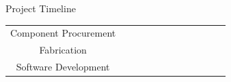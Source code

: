 \documentclass[aspectratio=169]{beamer}
\begin{document}
\begin{frame}{Project Timeline}
\begin{table}[]
\begin{tabular}{|c|l|l|l|l|l|l|l|l|l|l|l}
		Component Procurement                   &                                                                                      &                                                                                       & \cellcolor[HTML]{FFFFFF}                                                              & \cellcolor[HTML]{FFFFFF}                                                              &                                                                                      &                                                                                       & \cellcolor[HTML]{1AEFB2}                                                              &                                                                                       &                                                                                      &                                                                                       &                      \\ \cline{1-11}
		Fabrication                             &                                                                                      &                                                                                       &                                                                                       &                                                                                       &                                                                                      &                                                                                       & \cellcolor[HTML]{1AEFB2}                                                              & \cellcolor[HTML]{1AEFB2}                                                              & \cellcolor[HTML]{1AEFB2}                                                             & \cellcolor[HTML]{1AEFB2}                                                              &                      \\ \cline{1-11}
		Software Development                    &                                                                                      &                                                                                       &                                                                                       &                                                                                       &                                                                                      &                                                                                       & \cellcolor[HTML]{1AEFB2}                                                              & \cellcolor[HTML]{1AEFB2}                                                              & \cellcolor[HTML]{1AEFB2}                                                             &                                                                                       &                      \\ \cline{1-11}

\end{tabular}
\end{table}
\end{frame}
\end{document}
